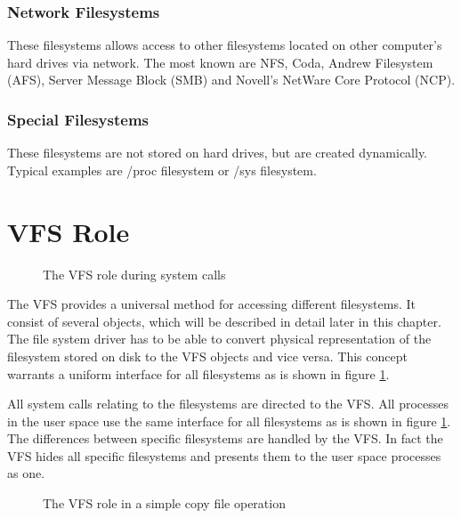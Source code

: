 \subsubsection*{Network Filesystems}
These filesystems allows access to other filesystems located on other computer's hard
drives via network. The most known are NFS, Coda, Andrew Filesystem (AFS), Server
Message Block (SMB) and Novell's NetWare Core Protocol (NCP).

\subsubsection*{Special Filesystems}
These filesystems are not stored on hard drives, but are created dynamically. Typical
examples are /proc filesystem or /sys filesystem.

\section{VFS Role}

\begin{figure}[h]
	\begin{center}
		
	\end{center}
	\caption{The VFS role during system calls}
	\label{fig:vfs_role}
\end{figure}

The VFS provides a universal method for accessing different filesystems. It consist of
several objects, which will be described in detail later in this chapter. The file
system driver has to be able to convert physical representation of the filesystem
stored on disk to the VFS objects and vice versa. This concept warrants a uniform
interface for all filesystems as is shown in figure \ref{fig:vfs_role}.

All system calls relating to the filesystems are directed to the VFS. All processes
in the user space use the same interface for all filesystems as is shown in figure
\ref{fig:vfs_role}. The differences between specific filesystems are handled by the VFS.
In fact the VFS hides all specific filesystems and presents them to the user space
processes as one.

\begin{figure}[h]
	\begin{center}
		
	\end{center}
	\caption{The VFS role in a simple copy file operation}
	\label{fig:vfs_copy}
\end{figure}

